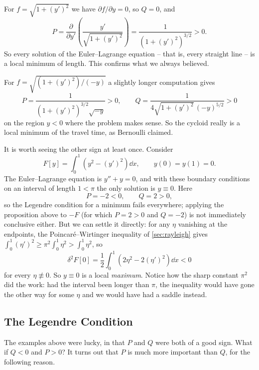 \begin{example}
	For $f = \sqrt{1 + (y')^2}$ we have $\partial f/\partial y = 0$, so $Q = 0$, and
	$$
	P = \frac{\partial}{\partial y'}\left(\frac{y'}{\sqrt{1 + (y')^2}}\right) = \frac{1}{\left(1 + (y')^2\right)^{3/2}} > 0.
	$$
	So every solution of the Euler--Lagrange equation -- that is, every straight line -- is a local minimum of length. This confirms what we always believed.
\end{example}

\begin{example}
	For $f = \sqrt{(1 + (y')^2)/(-y)}$ a slightly longer computation gives
	$$
	P = \frac{1}{\left(1 + (y')^2\right)^{3/2}\sqrt{-y}} > 0, \qquad Q = \frac{1}{4\sqrt{1 + (y')^2}\,(-y)^{5/2}} > 0
	$$
	on the region $y < 0$ where the problem makes sense. So the cycloid really is a local minimum of the travel time, as Bernoulli claimed.
\end{example}

\begin{example}[A Maximum]
	It is worth seeing the other sign at least once. Consider
	$$
	F[y] = \int_0^1\left(y^2 - (y')^2\right)\dd x, \qquad y(0) = y(1) = 0.
	$$
	The Euler--Lagrange equation is $y'' + y = 0$, and with these boundary conditions on an interval of length $1 < \pi$ the only solution is $y \equiv 0$. Here
	$$
	P = -2 < 0, \qquad Q = 2 > 0,
	$$
	so the Legendre condition for a minimum fails everywhere; applying the proposition above to $-F$ (for which $P = 2 > 0$ and $Q = -2$) is not immediately conclusive either. But we can settle it directly: for any $\eta$ vanishing at the endpoints, the Poincar\'e--Wirtinger inequality of \autoref{sec:rayleigh} gives $\int_0^1 (\eta')^2 \geq \pi^2\int_0^1\eta^2 > \int_0^1 \eta^2$, so
	$$
	\delta^2 F[0] = \frac{1}{2}\int_0^1\left(2\eta^2 - 2(\eta')^2\right)\dd x < 0
	$$
	for every $\eta \not\equiv 0$. So $y \equiv 0$ is a local \emph{maximum}. Notice how the sharp constant $\pi^2$ did the work: had the interval been longer than $\pi$, the inequality would have gone the other way for some $\eta$ and we would have had a saddle instead.
\end{example}

\subsection{The Legendre Condition}

The examples above were lucky, in that $P$ and $Q$ were both of a good sign. What if $Q < 0$ and $P > 0$? It turns out that $P$ is much more important than $Q$, for the following reason.

